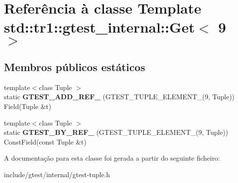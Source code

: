 \hypertarget{classstd_1_1tr1_1_1gtest__internal_1_1Get_3_019_01_4}{\section{Referência à classe Template std\-:\-:tr1\-:\-:gtest\-\_\-internal\-:\-:Get$<$ 9 $>$}
\label{classstd_1_1tr1_1_1gtest__internal_1_1Get_3_019_01_4}
}
\subsection*{Membros públicos estáticos}
\begin{DoxyCompactItemize}
\item 
\hypertarget{classstd_1_1tr1_1_1gtest__internal_1_1Get_3_019_01_4_add31197dfdb381d265e221ed62129f45}{{\footnotesize template$<$class Tuple $>$ }\\static {\bfseries G\-T\-E\-S\-T\-\_\-\-A\-D\-D\-\_\-\-R\-E\-F\-\_\-} (G\-T\-E\-S\-T\-\_\-\-T\-U\-P\-L\-E\-\_\-\-E\-L\-E\-M\-E\-N\-T\-\_\-(9, Tuple)) Field(Tuple \&t)}\label{classstd_1_1tr1_1_1gtest__internal_1_1Get_3_019_01_4_add31197dfdb381d265e221ed62129f45}

\item 
\hypertarget{classstd_1_1tr1_1_1gtest__internal_1_1Get_3_019_01_4_a5205e8da729e2bee446f5be0c65390af}{{\footnotesize template$<$class Tuple $>$ }\\static {\bfseries G\-T\-E\-S\-T\-\_\-\-B\-Y\-\_\-\-R\-E\-F\-\_\-} (G\-T\-E\-S\-T\-\_\-\-T\-U\-P\-L\-E\-\_\-\-E\-L\-E\-M\-E\-N\-T\-\_\-(9, Tuple)) Const\-Field(const Tuple \&t)}\label{classstd_1_1tr1_1_1gtest__internal_1_1Get_3_019_01_4_a5205e8da729e2bee446f5be0c65390af}

\end{DoxyCompactItemize}


A documentação para esta classe foi gerada a partir do seguinte ficheiro\-:\begin{DoxyCompactItemize}
\item 
include/gtest/internal/gtest-\/tuple.\-h\end{DoxyCompactItemize}
